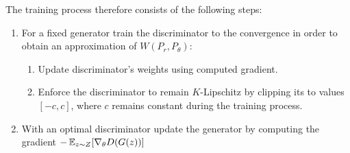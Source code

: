 The training process therefore consists of the following steps:
\begin{enumerate}
	\item For a fixed generator train the discriminator to the convergence in order to obtain an approximation of $W(P_r, P_\theta)$:
	\begin{enumerate}
		\item Update discriminator's weights using computed gradient.
		\item Enforce the discriminator to remain $K$-Lipschitz by clipping its to values $[-c, c]$, where $c$ remains constant during the training process.
	\end{enumerate}	
	\item With an optimal discriminator update the generator by computing the gradient $- \operatorname{\mathbb{E}}_{z \sim Z} [\nabla_\theta D(G(z))]$	
\end{enumerate}

